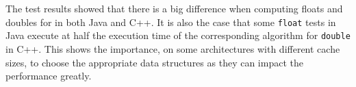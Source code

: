 The test results showed that there is a big difference when computing floats and doubles for in both Java and C++. It is also the case that some \texttt{float} tests in Java execute at half the execution time of the corresponding algorithm for \texttt{double} in C++. This shows the importance, on some architectures with different cache sizes, to choose the appropriate data structures as they can impact the performance greatly.
